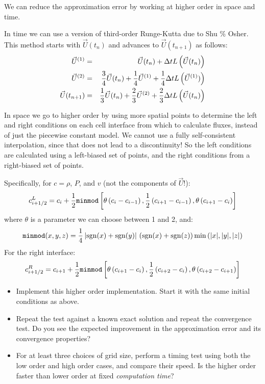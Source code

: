 \documentclass[11pt, preprint]{aastex}
\begin{document}
We can reduce the approximation error by working at higher order
in space and time.

In time we can use a version of third-order Runge-Kutta due to Shu \%
Osher. This method starts with $\vec{U}(t_n)$ and advances to
$\vec{U}(t_{n+1})$ as follows:
\begin{eqnarray}
\vec{U}^{(1)} &=& \vec{U}(t_n) + \Delta t L\left(\vec{U}(t_n)\right)
\cr
\vec{U}^{(2)} &=& \frac{3}{4} \vec{U}(t_n) + \frac{1}{4} \vec{U}^{(1)}
+ \frac{1}{4} \Delta t L\left(\vec{U}^{(1)})\right)\cr
\vec{U}(t_{n+1}) &=& \frac{1}{3} \vec{U}(t_n) + \frac{2}{3} \vec{U}^{(2)}
+ \frac{2}{3} \Delta t L\left(\vec{U}(t_n)\right)
\end{eqnarray}

In space we go to higher order by using more spatial points to
determine the left and right conditions on each cell interface from
which to calculate fluxes, instead of just the piecewise constant
model. We cannot use a fully self-consistent interpolation, since that
does not lead to a discontinuity! So the left conditions are
calculated using a left-biased set of points, and the right conditions
from a right-biased set of points.

Specifically, for $c= \rho$, $P$, and $v$ (not the components of
$\vec{U}$!):
\begin{equation}
  c_{i+1/2}^L = c_i + \frac{1}{2}
  {\tt minmod}\left[\theta \left(c_i - c_{i-1}\right),
  \frac{1}{2}\left(c_{i+1} - c_{i-1}\right), 
  \theta \left(c_{i+1} - c_{i}\right) \right] 
\end{equation}
where $\theta$ is a parameter we can choose between 1 and 2, and:
\begin{equation}
  {\tt minmod}(x, y, z) = \frac{1}{4}\left| {\rm sgn}(x) + {\rm
    sgn}(y) \right| \,
  \left( {\rm sgn}(x) + {\rm sgn}(z)\right) {\rm min}\left(|x|, |y|,
  |z|\right)
\end{equation}
For the right interface:
\begin{equation}
  c_{i+1/2}^R = c_{i+1} + \frac{1}{2}
  {\tt minmod}\left[\theta \left(c_{i+1} - c_{i}\right),
  \frac{1}{2}\left(c_{i+2} - c_{i}\right), 
  \theta \left(c_{i+2} - c_{i+1}\right) \right] 
\end{equation}

\begin{itemize}
\item Implement this higher order implementation. Start it with the
  same initial conditions as above.
\item Repeat the test against a known exact solution and repeat the
  convergence test. Do you see the expected improvement in the
  approximation error and its convergence properties?
\item For at least three choices of grid size, perform a timing test
  using both the low order and high order cases, and compare their
  speed. Is the higher order faster than lower order at fixed {\it
    computation time}?
\end{itemize}
\end{document}
